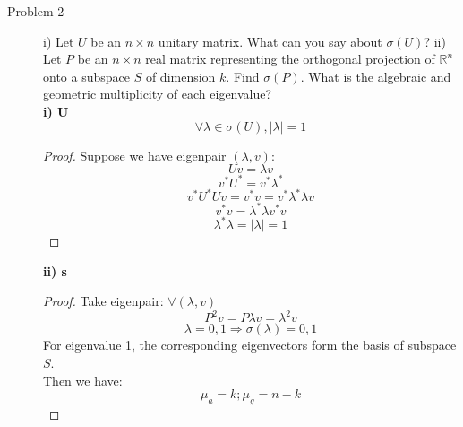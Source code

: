 \documentclass{article}
\begin{document}
\begin{description}
	\item[Problem 2] i) Let $U$ be an $n \times n$ unitary matrix. What can you say about $\sigma(U)$? ii) Let $P$ be an $n \times n$ real matrix representing the orthogonal projection of $\mathbb{R}^{n}$ onto a subspace $S$ of dimension $k$. Find $\sigma(P)$. What is the algebraic and geometric multiplicity of each eigenvalue? \\
	\textbf{i) U}
	$$\forall \lambda \in \sigma(U), |\lambda| = 1$$
	\begin{proof}
		Suppose we have eigenpair $(\lambda, v)$:
		$$ Uv = \lambda v$$
		$$ v^*U^* = v^*\lambda^*$$
		$$ v^*U^* Uv = v^*v = v^*\lambda^*\lambda v$$
		$$ v^*v = \lambda^*\lambda v^*v$$
		$$ \lambda^*\lambda = |\lambda| = 1$$
	\end{proof}
	\textbf{ii) s}
	\begin{proof}
		Take eigenpair: $\forall (\lambda, v)$
		$$P^2v = P\lambda v = \lambda^2 v$$
		$$ \lambda = 0, 1 \Rightarrow \sigma(\lambda) = {0, 1}$$
		For eigenvalue 1, the corresponding eigenvectors form the basis of subspace $S$.\\
		Then we have:
		$$ \mu_a = k; \mu_g = n - k$$
	\end{proof}

\end{description}
\end{document}
